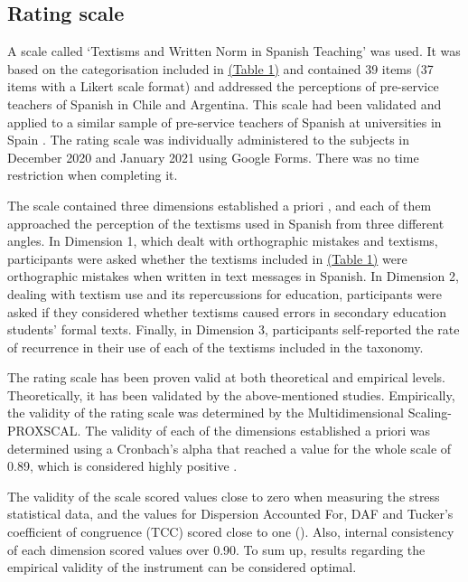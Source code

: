 \documentclass[english]{textolivre}
\begin{document}
\subsection{Rating scale}
A scale called ‘Textisms and Written Norm in Spanish Teaching’ was used. It was based on the categorisation included in \href{tbl-tabela-01}{(Table 1)} and contained 39 items (37 items with a Likert scale format) and addressed the perceptions of pre-service teachers of Spanish in Chile and Argentina. This scale had been validated and applied to a similar sample of pre-service teachers of Spanish at universities in Spain \cite{Gomez-Camacho2018}. The rating scale was individually administered to the subjects in December 2020 and January 2021 using Google Forms. There was no time restriction when completing it.

The scale contained three dimensions established a priori \cite{Gomez-Camacho2018}, and each of them approached the perception of the textisms used in Spanish from three different angles. In Dimension 1, which dealt with orthographic mistakes and textisms, participants were asked whether the textisms included in \href{tbl-tabela-01}{(Table 1)} were orthographic mistakes when written in text messages in Spanish. In Dimension 2, dealing with textism use and its repercussions for education, participants were asked if they considered whether textisms caused errors in secondary education students’ formal texts. Finally, in Dimension 3, participants self-reported the rate of recurrence in their use of each of the textisms included in the taxonomy.

The rating scale has been proven valid at both theoretical and empirical levels. Theoretically, it has been validated by the above-mentioned studies. Empirically, the validity of the rating scale was determined by the Multidimensional Scaling-PROXSCAL. The validity of each of the dimensions established a priori was determined using a Cronbach’s alpha that reached a value for the whole scale of 0.89, which is considered highly positive \cite{Borg2013, OHare1980}.

The validity of the scale scored values close to zero when measuring the stress statistical data, and the values for Dispersion Accounted For, DAF and Tucker’s coefficient of congruence (TCC) scored close to one (). Also, internal consistency of each dimension scored values over 0.90. To sum up, results regarding the empirical validity of the instrument can be considered optimal. 
\end{document}

